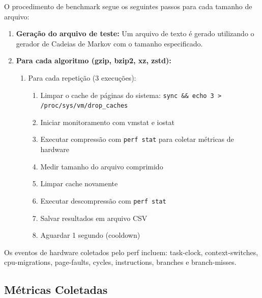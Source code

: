 \documentclass[acmsmall]{acmart}
\begin{document}
O procedimento de benchmark segue os seguintes passos para cada tamanho de arquivo:

\begin{enumerate}
  \item \textbf{Geração do arquivo de teste:} Um arquivo de texto é gerado utilizando o gerador de Cadeias de Markov com o tamanho especificado.

  \item \textbf{Para cada algoritmo (gzip, bzip2, xz, zstd):}
  \begin{enumerate}
    \item Para cada repetição (3 execuções):
    \begin{enumerate}
      \item Limpar o cache de páginas do sistema: \texttt{sync \&\& echo 3 > /proc/sys/vm/drop\_caches}
      \item Iniciar monitoramento com vmstat e iostat
      \item Executar compressão com \texttt{perf stat} para coletar métricas de hardware
      \item Medir tamanho do arquivo comprimido
      \item Limpar cache novamente
      \item Executar descompressão com \texttt{perf stat}
      \item Salvar resultados em arquivo CSV
      \item Aguardar 1 segundo (cooldown)
    \end{enumerate}
  \end{enumerate}
\end{enumerate}

Os eventos de hardware coletados pelo perf incluem: task-clock, context-switches, cpu-migrations, page-faults, cycles, instructions, branches e branch-misses.

\subsection{Métricas Coletadas}
\end{document}
